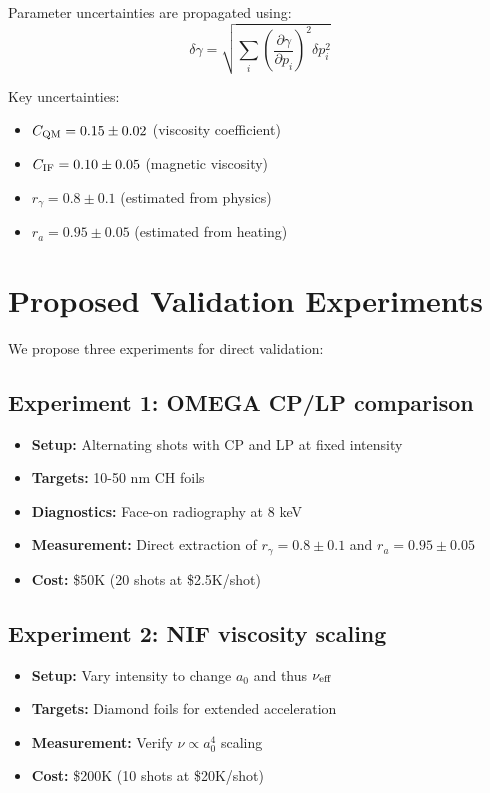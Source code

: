 \documentclass[aps,pre,twocolumn,showpacs,superscriptaddress]{revtex4-2}
\theoremstyle{definition}
\begin{document}
Parameter uncertainties are propagated using:
\begin{equation}
\delta\gamma = \sqrt{\sum_i \left(\frac{\partial\gamma}{\partial p_i}\right)^2 \delta p_i^2}
\end{equation}

Key uncertainties:
\begin{itemize}
\item $C_{\rm QM} = 0.15 \pm 0.02$ (viscosity coefficient)
\item $C_{\rm IF} = 0.10 \pm 0.05$ (magnetic viscosity)
\item $r_\gamma = 0.8 \pm 0.1$ (estimated from physics)
\item $r_a = 0.95 \pm 0.05$ (estimated from heating)
\end{itemize}

\section{Proposed Validation Experiments}\label{sec:proposed}

We propose three experiments for direct validation:

\subsection{Experiment 1: OMEGA CP/LP comparison}
\begin{itemize}
\item \textbf{Setup:} Alternating shots with CP and LP at fixed intensity
\item \textbf{Targets:} 10-50 nm CH foils
\item \textbf{Diagnostics:} Face-on radiography at 8 keV
\item \textbf{Measurement:} Direct extraction of $r_\gamma = 0.8 \pm 0.1$ and $r_a = 0.95 \pm 0.05$
\item \textbf{Cost:} \$50K (20 shots at \$2.5K/shot)
\end{itemize}

\subsection{Experiment 2: NIF viscosity scaling}
\begin{itemize}
\item \textbf{Setup:} Vary intensity to change $a_0$ and thus $\nu_{\rm eff}$
\item \textbf{Targets:} Diamond foils for extended acceleration
\item \textbf{Measurement:} Verify $\nu \propto a_0^4$ scaling
\item \textbf{Cost:} \$200K (10 shots at \$20K/shot)
\end{itemize}
\end{document}
